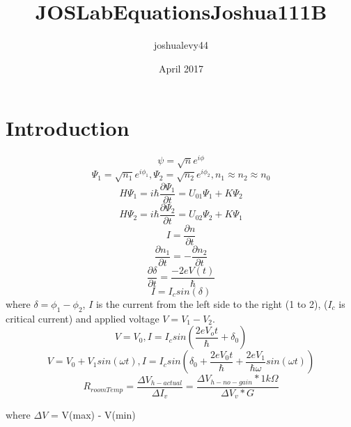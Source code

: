 \documentclass{article}
\title{JOSLabEquationsJoshua111B}
\author{joshualevy44 }
\date{April 2017}
\begin{document}
\maketitle

\section{Introduction}

\begin{equation}
    \psi = \sqrt{n}e^{i\phi}
\end{equation}
\begin{equation}
\Psi_1 = \sqrt{n_1}e^{i\phi_1}, \Psi_2 = \sqrt{n_2}e^{i\phi_2}, n_1 \approx n_2 \approx n_0
\end{equation}
\begin{equation}
H\Psi_1 = i\hbar \frac{\partial \Psi_1}{\partial t} = U_{01}\Psi_1 + K\Psi_2 
\end{equation}
\begin{equation}
H\Psi_2 = i\hbar \frac{\partial \Psi_2}{\partial t} = U_{02}\Psi_2 + K\Psi_1
\end{equation}
\begin{equation}
I = \frac{\partial n}{\partial t}
\end{equation}
\begin{equation}
\frac{\partial n_1}{\partial t}=-\frac{\partial n_2}{\partial t}
\end{equation}
\begin{equation}
\frac{\partial \delta}{\partial t} = \frac{-2eV(t)}{\hbar}
\end{equation}
\begin{equation}
I = I_c sin(\delta)
\end{equation}
where $\delta = \phi_1 - \phi_2$, $I$ is the current from the left side to the right (1 to 2), ($I_c$ is critical current) and applied voltage $V = V_1 - V_2$.
\begin{equation}
V = V_0, I = I_c sin(\frac{2eV_o t}{\hbar} + \delta_0)
\end{equation}
\begin{equation}
V = V_0 + V_1 sin(\omega t), I = I_c sin(\delta_0 + \frac{2eV_0t}{\hbar} + \frac{2eV_1}{\hbar \omega}sin(\omega t))
\end{equation}
\begin{equation}
R_{roomTemp} = \frac{\Delta V_{h- actual}}{\Delta I_v} = \frac{\Delta V_{h-no- gain}*1k\Omega}{\Delta V_{v}*G}
\end{equation}
\begin{center}where $\Delta V$ = V(max) - V(min)\end{center}
\end{document}
